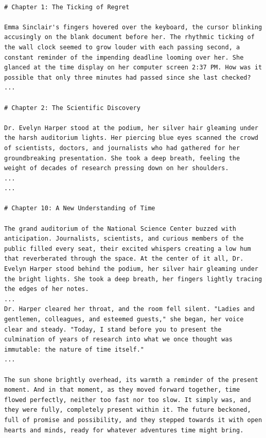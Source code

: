 \documentclass{article} %
\theoremstyle{plain}
\theoremstyle{definition}
\theoremstyle{remark}
\begin{document}
\label{appendix:AFLOW generate novel}

\begin{tcolorbox}[title={\textbf{\small AFlow-Generated Novel}}, boxrule=2pt, arc=0mm, breakable]\begin{verbatim}

# Chapter 1: The Ticking of Regret

Emma Sinclair's fingers hovered over the keyboard, the cursor blinking accusingly on the blank document before her. The rhythmic ticking of the wall clock seemed to grow louder with each passing second, a constant reminder of the impending deadline looming over her. She glanced at the time display on her computer screen 2:37 PM. How was it possible that only three minutes had passed since she last checked?
...

# Chapter 2: The Scientific Discovery

Dr. Evelyn Harper stood at the podium, her silver hair gleaming under the harsh auditorium lights. Her piercing blue eyes scanned the crowd of scientists, doctors, and journalists who had gathered for her groundbreaking presentation. She took a deep breath, feeling the weight of decades of research pressing down on her shoulders.
...
...

# Chapter 10: A New Understanding of Time

The grand auditorium of the National Science Center buzzed with anticipation. Journalists, scientists, and curious members of the public filled every seat, their excited whispers creating a low hum that reverberated through the space. At the center of it all, Dr. Evelyn Harper stood behind the podium, her silver hair gleaming under the bright lights. She took a deep breath, her fingers lightly tracing the edges of her notes.
...
Dr. Harper cleared her throat, and the room fell silent. "Ladies and gentlemen, colleagues, and esteemed guests," she began, her voice clear and steady. "Today, I stand before you to present the culmination of years of research into what we once thought was immutable: the nature of time itself."
...

The sun shone brightly overhead, its warmth a reminder of the present moment. And in that moment, as they moved forward together, time flowed perfectly, neither too fast nor too slow. It simply was, and they were fully, completely present within it. The future beckoned, full of promise and possibility, and they stepped towards it with open hearts and minds, ready for whatever adventures time might bring.

\end{verbatim}
\end{tcolorbox}
\end{document}
